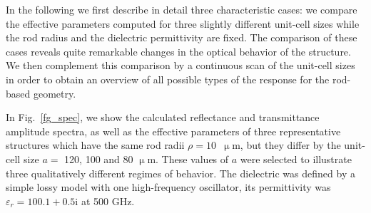 \documentclass[letterpaper,12pt]{report}
\begin{document}

In the following we first describe in detail three characteristic cases: we compare the
effective parameters computed for three slightly different unit-cell sizes while the rod
radius and the dielectric permittivity are fixed. The comparison of these cases reveals quite
remarkable changes in the optical behavior of the structure. We then complement this
comparison by a continuous scan of the unit-cell sizes in order to obtain an overview of
all possible types of the response for the rod-based geometry.

In Fig.~\ref{fg_spec}, we show the calculated reflectance and transmittance amplitude
spectra, as well as the effective parameters of three representative structures which
have the same rod radii $\rho = 10$~$\upmu$m, but they differ by the unit-cell size $a =$ 120, 100 and 80 $\upmu$m. These
values of $a$ were selected to illustrate three qualitatively different regimes of
behavior.
The dielectric was defined by a simple lossy model with one high-frequency oscillator, its  permittivity was $\varepsilon_r = 100.1 + 0.5\mathrm{i}$ at 500 GHz.
\end{document}
